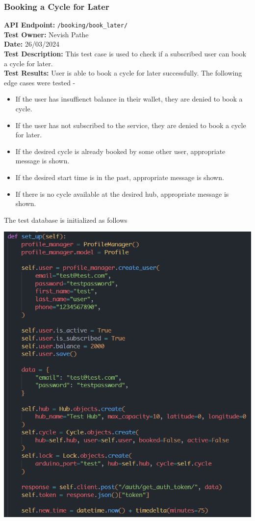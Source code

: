 \documentclass[11pt]{article}
\begin{document}
\subsubsection{Booking a Cycle for Later}
\textbf{API Endpoint: } \texttt{/booking/book\_later/} \\
\textbf{Test Owner: } Nevish Pathe \\
\textbf{Date: } 26/03/2024 \\
\textbf{Test Description: } This test case is used to check if a subscribed user can book a cycle for later. \\
\textbf{Test Results: } User is able to book a cycle for later successfully. The following edge cases were tested -
\begin{itemize}
    \itemsep 0em
    \item If the user has insuffienct balance in their wallet, they are denied to book a cycle.
    \item If the user has not subscribed to the service, they are denied to book a cycle for later.
    \item If the desired cycle is already booked by some other user, appropriate message is shown.
    \item If the desired start time is in the past, appropriate message is shown.
    \item If there is no cycle available at the desired hub, appropriate message is shown.
\end{itemize}

The test database is initialized as follows
\begin{center}
    \includegraphics[scale=0.75]{unit_testing_codes/book_later_setup.png}
\end{center}
\end{document}
